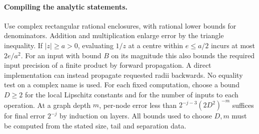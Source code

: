 \paragraph{Compiling the analytic statements.}
Use complex rectangular rational enclosures, with rational lower bounds for denominators. Addition and multiplication enlarge error by the triangle inequality. If $|z|\ge a>0$, evaluating $1/z$ at a centre within $e\le a/2$ incurs at most $2e/a^2$. For an input with bound $B$ on its magnitude this also bounds the required input precision of a finite product by forward propagation. A direct implementation can instead propagate requested radii backwards. No equality test on a complex name is used. For each fixed computation, choose a bound $D\ge2$ for the local Lipschitz constants and for the number of inputs to each operation. At a graph depth $m$, per-node error less than $2^{-j-3}(2D^2)^{-m}$ suffices for final error $2^{-j}$ by induction on layers. All bounds used to choose $D,m$ must be computed from the stated size, tail and separation data.

